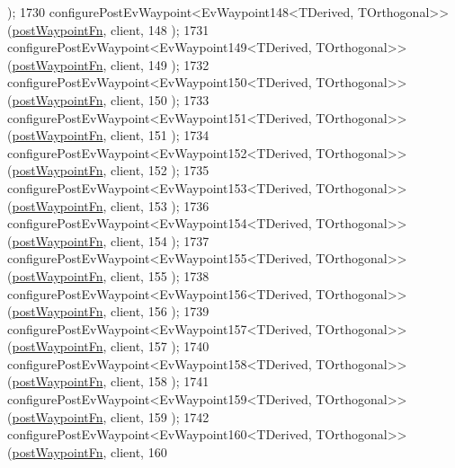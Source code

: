 \begin{DoxyCode}
      );
1730     configurePostEvWaypoint<EvWaypoint148<TDerived, TOrthogonal>>(\hyperlink{classcl__move__base__z_1_1WaypointEventDispatcher_a964a57fcce5d48ec60243230722d8dd7}{postWaypointFn}, client, 148
      );
1731     configurePostEvWaypoint<EvWaypoint149<TDerived, TOrthogonal>>(\hyperlink{classcl__move__base__z_1_1WaypointEventDispatcher_a964a57fcce5d48ec60243230722d8dd7}{postWaypointFn}, client, 149
      );
1732     configurePostEvWaypoint<EvWaypoint150<TDerived, TOrthogonal>>(\hyperlink{classcl__move__base__z_1_1WaypointEventDispatcher_a964a57fcce5d48ec60243230722d8dd7}{postWaypointFn}, client, 150
      );
1733     configurePostEvWaypoint<EvWaypoint151<TDerived, TOrthogonal>>(\hyperlink{classcl__move__base__z_1_1WaypointEventDispatcher_a964a57fcce5d48ec60243230722d8dd7}{postWaypointFn}, client, 151
      );
1734     configurePostEvWaypoint<EvWaypoint152<TDerived, TOrthogonal>>(\hyperlink{classcl__move__base__z_1_1WaypointEventDispatcher_a964a57fcce5d48ec60243230722d8dd7}{postWaypointFn}, client, 152
      );
1735     configurePostEvWaypoint<EvWaypoint153<TDerived, TOrthogonal>>(\hyperlink{classcl__move__base__z_1_1WaypointEventDispatcher_a964a57fcce5d48ec60243230722d8dd7}{postWaypointFn}, client, 153
      );
1736     configurePostEvWaypoint<EvWaypoint154<TDerived, TOrthogonal>>(\hyperlink{classcl__move__base__z_1_1WaypointEventDispatcher_a964a57fcce5d48ec60243230722d8dd7}{postWaypointFn}, client, 154
      );
1737     configurePostEvWaypoint<EvWaypoint155<TDerived, TOrthogonal>>(\hyperlink{classcl__move__base__z_1_1WaypointEventDispatcher_a964a57fcce5d48ec60243230722d8dd7}{postWaypointFn}, client, 155
      );
1738     configurePostEvWaypoint<EvWaypoint156<TDerived, TOrthogonal>>(\hyperlink{classcl__move__base__z_1_1WaypointEventDispatcher_a964a57fcce5d48ec60243230722d8dd7}{postWaypointFn}, client, 156
      );
1739     configurePostEvWaypoint<EvWaypoint157<TDerived, TOrthogonal>>(\hyperlink{classcl__move__base__z_1_1WaypointEventDispatcher_a964a57fcce5d48ec60243230722d8dd7}{postWaypointFn}, client, 157
      );
1740     configurePostEvWaypoint<EvWaypoint158<TDerived, TOrthogonal>>(\hyperlink{classcl__move__base__z_1_1WaypointEventDispatcher_a964a57fcce5d48ec60243230722d8dd7}{postWaypointFn}, client, 158
      );
1741     configurePostEvWaypoint<EvWaypoint159<TDerived, TOrthogonal>>(\hyperlink{classcl__move__base__z_1_1WaypointEventDispatcher_a964a57fcce5d48ec60243230722d8dd7}{postWaypointFn}, client, 159
      );
1742     configurePostEvWaypoint<EvWaypoint160<TDerived, TOrthogonal>>(\hyperlink{classcl__move__base__z_1_1WaypointEventDispatcher_a964a57fcce5d48ec60243230722d8dd7}{postWaypointFn}, client, 160

\end{DoxyCode}
